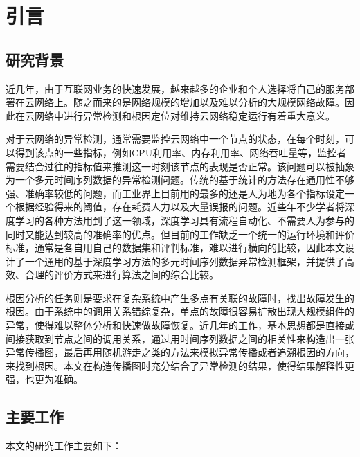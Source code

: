
\chapter{引言}
\label{cha:intro}

\section{研究背景}
近几年，由于互联网业务的快速发展，越来越多的企业和个人选择将自己的服务部署在云网络上。随之而来的是网络规模的增加以及难以分析的大规模网络故障。因此在云网络中进行异常检测和根因定位对维持云网络稳定运行有着重大意义。

对于云网络的异常检测，通常需要监控云网络中一个节点的状态，在每个时刻，可以得到该点的一些指标，例如CPU利用率、内存利用率、网络吞吐量等，监控者需要结合过往的指标值来推测这一时刻该节点的表现是否正常。该问题可以被抽象为一个多元时间序列数据的异常检测问题。传统的基于统计的方法存在通用性不够强、准确率较低的问题，而工业界上目前用的最多的还是人为地为各个指标设定一个根据经验得来的阈值，存在耗费人力以及大量误报的问题。近些年不少学者\cite{an2015variational,malhotra2015long,malhotra2016lstm,nguyen2018anomaly,park2018multimodal,ruff2018deep,su2019robust,zong2018deep,xu2018unsupervised,siffer2017anomaly}将深度学习的各种方法用到了这一领域，深度学习具有流程自动化、不需要人为参与的同时又能达到较高的准确率的优点。但目前的工作缺乏一个统一的运行环境和评价标准，通常是各自用自己的数据集和评判标准，难以进行横向的比较，因此本文设计了一个通用的基于深度学习方法的多元时间序列数据异常检测框架，并提供了高效、合理的评价方式来进行算法之间的综合比较。

根因分析的任务则是要求在复杂系统中产生多点有关联的故障时，找出故障发生的根因。由于系统中的调用关系错综复杂，单点的故障很容易扩散出现大规模组件的异常，使得难以整体分析和快速做故障恢复。近几年的工作\cite{lin2016automated,weng2018root,wu2020microrca}，基本思想都是直接或间接获取到节点之间的调用关系，通过用时间序列数据之间的相关性来构造出一张异常传播图，最后再用随机游走之类的方法来模拟异常传播或者追溯根因的方向，来找到根因。本文在构造传播图时充分结合了异常检测的结果，使得结果解释性更强，也更为准确。


\section{主要工作}
本文的研究工作主要如下：

